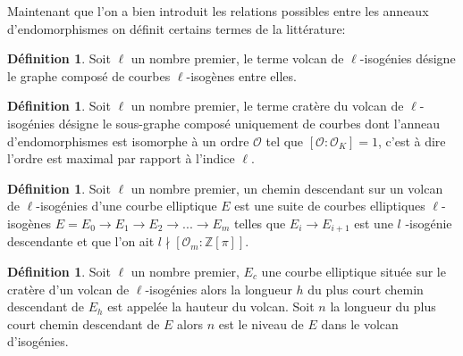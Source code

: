 \documentclass[10pt,a4paper]{book}
\theoremstyle{plain}
\theoremstyle{definition}
\theoremstyle{definition}
\theoremstyle{definition}
\theoremstyle{definition}
\newtheorem{defi}[thm]{Définition}
\theoremstyle{remark}
\theoremstyle{remark}
\begin{document}
Maintenant que l'on a bien introduit les relations possibles entre les anneaux d'endomorphismes on définit certains termes de la littérature:

\begin{defi}
Soit $\ell$ un nombre premier, le terme volcan de $\ell$-isogénies désigne le graphe composé de courbes $\ell$-isogènes entre elles.
\end{defi}

\begin{defi}
Soit $\ell$ un nombre premier, le terme cratère du volcan de $\ell$-isogénies désigne le sous-graphe composé uniquement de courbes dont l'anneau d'endomorphismes est isomorphe à un ordre $\mathcal{O}$ tel que $[\mathcal{O}: \mathcal{O}_K]=1$, c'est à dire l'ordre est maximal par rapport à l'indice $\ell$.
\end{defi}

\begin{defi}
Soit $\ell$ un nombre premier, un chemin descendant sur un volcan de $\ell$-isogénies d'une courbe elliptique $E$ est une suite de courbes elliptiques $\ell$-isogènes $E=E_0 \rightarrow E_1 \rightarrow E_2 \rightarrow ... \rightarrow E_m$ telles que $E_i \rightarrow E_{i+1}$ est une $l$ -isogénie descendante et que l'on ait $l \nmid [ \mathcal{O}_m : \mathbb{Z}[\pi]]$. 
\end{defi}

\begin{defi}
Soit $\ell$ un nombre premier, $E_c$ une courbe elliptique située sur le cratère d'un volcan de $\ell$-isogénies alors la longueur $h$ du plus court chemin descendant de $E_h$ est appelée la hauteur du volcan.
Soit $n$ la longueur du plus court chemin descendant de $E$ alors $n$ est le niveau de $E$ dans le volcan d'isogénies.
\end{defi}
\end{document}
